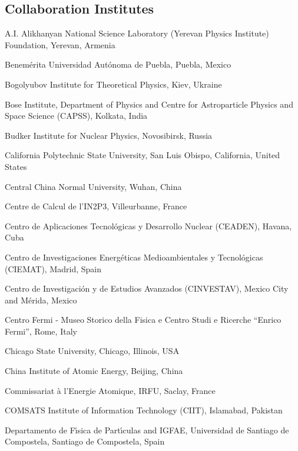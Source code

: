 \begin{flushleft}
\section*{Collaboration Institutes}
\renewcommand\theenumi{\arabic{enumi}~}
\begin{Authlist}

\item {}A.I. Alikhanyan National Science Laboratory (Yerevan Physics Institute) Foundation, Yerevan, Armenia
\item {}Benem\'{e}rita Universidad Aut\'{o}noma de Puebla, Puebla, Mexico
\item {}Bogolyubov Institute for Theoretical Physics, Kiev, Ukraine
\item {}Bose Institute, Department of Physics and Centre for Astroparticle Physics and Space Science (CAPSS), Kolkata, India
\item {}Budker Institute for Nuclear Physics, Novosibirsk, Russia
\item {}California Polytechnic State University, San Luis Obispo, California, United States
\item {}Central China Normal University, Wuhan, China
\item {}Centre de Calcul de l'IN2P3, Villeurbanne, France
\item {}Centro de Aplicaciones Tecnol\'{o}gicas y Desarrollo Nuclear (CEADEN), Havana, Cuba
\item {}Centro de Investigaciones Energ\'{e}ticas Medioambientales y Tecnol\'{o}gicas (CIEMAT), Madrid, Spain
\item {}Centro de Investigaci\'{o}n y de Estudios Avanzados (CINVESTAV), Mexico City and M\'{e}rida, Mexico
\item {}Centro Fermi - Museo Storico della Fisica e Centro Studi e Ricerche ``Enrico Fermi'', Rome, Italy
\item {}Chicago State University, Chicago, Illinois, USA
\item {}China Institute of Atomic Energy, Beijing, China
\item {}Commissariat \`{a} l'Energie Atomique, IRFU, Saclay, France
\item {}COMSATS Institute of Information Technology (CIIT), Islamabad, Pakistan
\item {}Departamento de F\'{\i}sica de Part\'{\i}culas and IGFAE, Universidad de Santiago de Compostela, Santiago de Compostela, Spain

\end{Authlist}
\end{flushleft}
